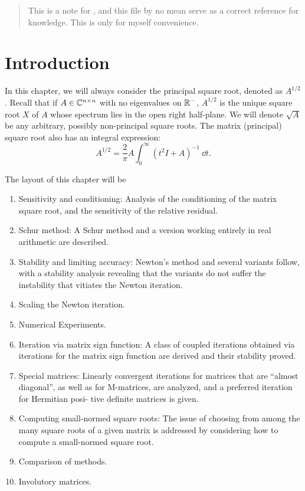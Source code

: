 \documentclass{article}
\begin{document}
\maketitle
\tableofcontents
\thispagestyle{firstpage} 
\begin{abstract}
  This is a note for \cite{high08_FM}, and this file by no mean serve as a
  correct reference for knowledge. This is only for myself convenience. 
\end{abstract}

\section{Introduction}\label{sec:introduction}
In this chapter, we will always consider the principal square root, denoted
as $A^{1/2}$. Recall that if $A\in\mathbb{C}^{n\times n}$ with no eigenvalues on $\mathbb{R}^-$,
$A^{1/2}$ is the unique square root $X$ of $A$ whose spectrum lies in the
open right half-plane. We will denote $\sqrt{A}$ be any arbitrary, possibly
non-principal square roots. The matrix (principal) square root also
has an integral expression:
\begin{equation}\label{eq:sqrt-integral}
  A^{1/2} = \frac{2}{\pi}A\int_0^{\infty}(t^2I + A)^{-1}~\dd t.
\end{equation}

The layout of this chapter will be 
\begin{enumerate}
\item Sensitivity and conditioning: Analysis of the conditioning of the
  matrix square root, and the sensitivity of the relative residual.
\item Schur method: A Schur method and a version working entirely in real
  arithmetic are described.
\item Stability and limiting accuracy: Newton’s method and several variants
  follow, with a stability analysis revealing that the variants do not
  suffer the instability that vitiates the Newton iteration. 
\item Scaling the Newton iteration.
\item Numerical Experiments.
\item Iteration via matrix sign function: A class of coupled iterations
  obtained via iterations for the matrix sign function are derived and
  their stability proved. 
\item Special matrices: Linearly convergent iterations for matrices that
  are “almost diagonal”, as well as for M-matrices, are analyzed, and a
  preferred iteration for Hermitian posi- tive definite matrices is given. 
\item Computing small-normed square roots: The issue of choosing from among
  the many square roots of a given matrix is addressed by considering how
  to compute a small-normed square root. 
\item Comparison of methods.
\item Involutory matrices.
\end{enumerate}
\end{document}
